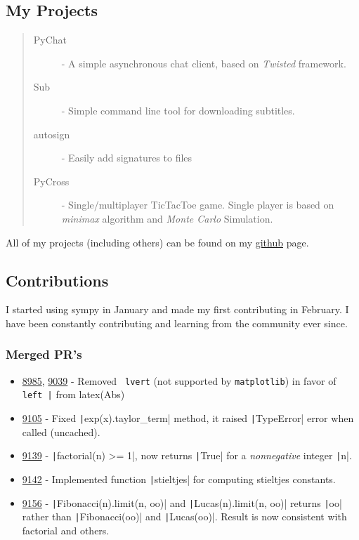 \documentclass[a4paper,12pt]{article}
\newcommand{\pyline}[1]{\texttt|#1|}
\newcommand{\pull}[1]{\href{https://github.com/sympy/sympy/pull/#1}{#1}}
\begin{document}
\subsection*{My Projects}
\begin{quote}
  \begin{description}
    \item [PyChat \cite{pychat}] - A simple asynchronous chat client, based on \emph{Twisted}\cite{twisted} framework.
    \item [Sub \cite{sub}] - Simple command line tool for downloading subtitles.
    \item [autosign \cite{autosign}] - Easily add signatures to files
    \item [PyCross \cite{pycross}] - Single/multiplayer TicTacToe game. Single player is based on \emph{minimax}\cite{minimax} algorithm and \emph{Monte Carlo}\cite{montecarlo} Simulation.
  \end{description}
\end{quote}

All of my projects (including others) can be found on my \href{https://github.com/leosartaj}{github} page.

\subsection*{Contributions}
I started using sympy in January and made my first contributing in February.
I have been constantly contributing and learning from the community ever since.

\subsubsection*{Merged PR's}
\begin{itemize}
  \item \pull{8985}, \pull{9039} - Removed \texttt{ lvert} (not supported by \texttt{matplotlib}) in favor of \texttt{ left |} from latex(Abs)
  \item \pull{9105} - Fixed \pyline{exp(x).taylor_term} method, it raised \pyline{TypeError} error when called (uncached).
  \item \pull{9139} - \pyline{factorial(n) >= 1}, now returns \pyline{True} for a \textit{nonnegative} integer \pyline{n}.
  \item \pull{9142} - Implemented function \pyline{stieltjes} for computing stieltjes constants.
  \item \pull{9156} - \pyline{Fibonacci(n).limit(n, oo)} and \pyline{Lucas(n).limit(n, oo)} returns \pyline{oo} rather than \pyline{Fibonacci(oo)} and \pyline{Lucas(oo)}. Result is now consistent with factorial and others.
\end{itemize}
\end{document}
